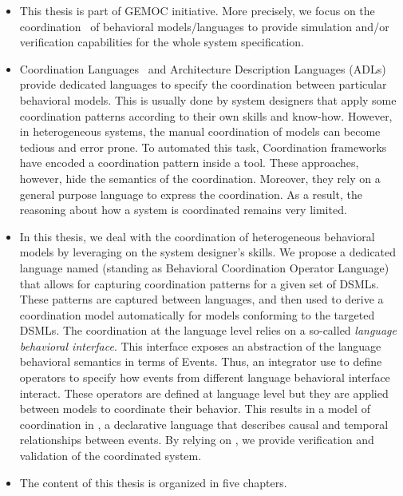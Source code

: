 \begin{itemize}
	\item This thesis is part of GEMOC initiative. More precisely, we focus on the coordination~\cite{coordsignibib} of behavioral models/languages to provide simulation and/or verification capabilities for the whole system specification. 
	
	
	\item Coordination Languages~\cite{coordsignibib} and Architecture Description Languages (ADLs)~\cite{frameadlsbib} provide dedicated languages to specify the coordination between particular behavioral models. This is usually done by system designers that apply some coordination patterns according to their own skills and know-how. However, in heterogeneous systems, the manual coordination of models can become tedious and error prone. To automated this task, Coordination frameworks~\cite{ptoleframebib,modhelxbib} have encoded a coordination pattern inside a tool. These approaches, however, hide the semantics of the coordination. Moreover, they rely on a general purpose language to express the coordination. As a result, the reasoning about how a system is coordinated remains very limited.  
	
\item In this thesis, we deal with the coordination of heterogeneous behavioral models by leveraging on the system designer's skills. We propose a dedicated language named \bcool (standing as Behavioral Coordination Operator Language) that allows for capturing coordination patterns for a given set of DSMLs. These patterns are captured between languages, and then used to derive a coordination model automatically for models conforming to the targeted DSMLs. The coordination at the language level relies on a so-called \emph{language behavioral interface}. This interface exposes an abstraction of the language behavioral semantics in terms of Events. Thus, an integrator use \bcool to define operators to specify how events from different language behavioral interface interact. These operators are defined at language level but they are applied between models to coordinate their behavior. This results in a model of coordination in \ccsl, a declarative language that describes causal and temporal relationships between events. By relying on \ccsl, we provide verification and validation of the coordinated system.    

\item The content of this thesis is organized  in five chapters. 


\end{itemize}
